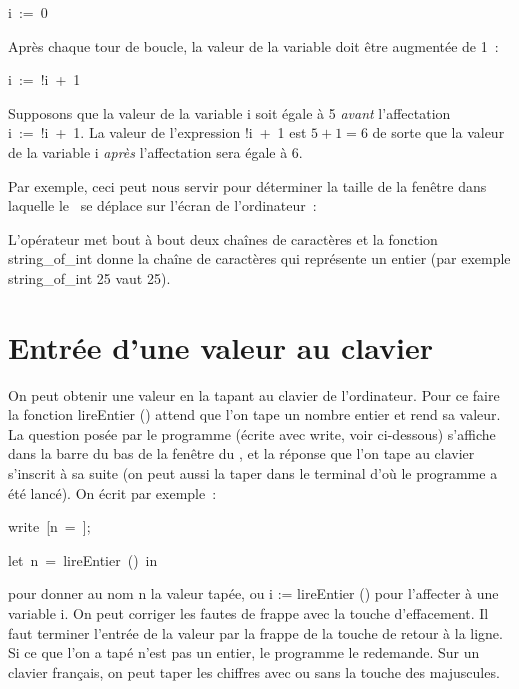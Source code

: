 \mbox{\blc  \blk\blk\idt  i\ :=\ 0}\par

\noindent Après chaque tour de boucle, la valeur de la variable doit être augmentée de 1~:

\mbox{\blc  \blk\blk\idt  i\ :=\ !i\ +\ 1}\par

\noindent Supposons que la valeur de la variable {\idt i} soit égale à 5 {\em avant} l'affectation
\mbox{\idt  i\ :=\ !i\ +\ 1}. La valeur de l'expression {\idt  !i\ +\ 1}
est $5 + 1 = 6$ de sorte que la valeur de la variable {\idt i} {\em après} l'affectation sera égale
à 6.

Par exemple, ceci peut nous servir pour déterminer la taille de la fenêtre dans laquelle le \robot\
se déplace sur l'écran de l'ordinateur~:


\noindent L'opérateur {\idt {}} met bout à bout deux chaînes de caractères et la
fonction {\idt string\_of\_int} donne la chaîne de caractères qui représente un entier (par
exemple {\idt string\_of\_int 25} vaut {\cha \char34{}25\char34}).

\section{Entrée d'une valeur au clavier}
On peut obtenir une valeur en la tapant au clavier de
l'ordinateur. Pour
ce faire la fonction {\idt lireEntier ()} attend que l'on tape un nombre entier et rend
sa valeur. La question posée par le programme (écrite avec {\idt write}, voir ci-dessous)
s'affiche dans la barre du bas de la fenêtre du \robot, et la réponse que l'on tape au clavier
s'inscrit à sa suite (on peut aussi la taper dans le terminal d'où le programme a été lancé).
On écrit par exemple~:

\mbox{\blc  \blk\blk\idt  write\ [{\cha {}n\ =\ }];}\par
\mbox{\blc  \blk\blk\idt  \mcl let\idt \ n\ =\ lireEntier\ ()\ \mcl in}\par

\noindent pour donner au nom {\idt n} la valeur tapée, ou {\idt i := lireEntier ()} pour
l'affecter à une variable {\idt i}. On peut
corriger les fautes de frappe avec la touche  %
\framebox[11.mm][l]{$\leftarrow$~~~}\hspace{0.3ex}
d'effacement. Il faut terminer l'entrée de la valeur par la frappe de la touche %
\framebox[11.mm][l]{$\hookleftarrow$~~~}\hspace{0.3ex}
de retour à la ligne. Si ce que l'on a tapé n'est pas un entier, le programme le
redemande. Sur un clavier français, on peut taper les chiffres avec ou sans la touche
des majuscules.

